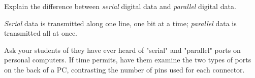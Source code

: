

Explain the difference between {\it serial} digital data and {\it parallel} digital data.







{\it Serial} data is transmitted along one line, one bit at a time; {\it parallel} data is transmitted all at once.







Ask your students of they have ever heard of "serial" and "parallel" ports on personal computers.  If time permits, have them examine the two types of ports on the back of a PC, contrasting the number of pins used for each connector.




